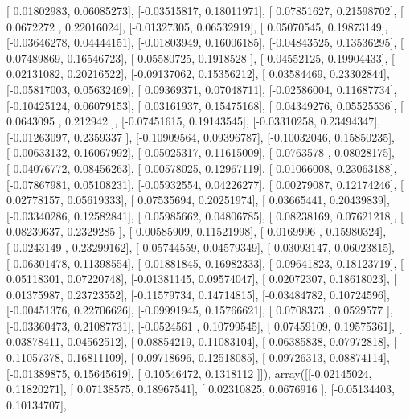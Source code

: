 \documentclass{article}
\begin{document}
       [ 0.01802983,  0.06085273],
       [-0.03515817,  0.18011971],
       [ 0.07851627,  0.21598702],
       [ 0.0672272 ,  0.22016024],
       [-0.01327305,  0.06532919],
       [ 0.05070545,  0.19873149],
       [-0.03646278,  0.04444151],
       [-0.01803949,  0.16006185],
       [-0.04843525,  0.13536295],
       [ 0.07489869,  0.16546723],
       [-0.05580725,  0.1918528 ],
       [-0.04552125,  0.19904433],
       [ 0.02131082,  0.20216522],
       [-0.09137062,  0.15356212],
       [ 0.03584469,  0.23302844],
       [-0.05817003,  0.05632469],
       [ 0.09369371,  0.07048711],
       [-0.02586004,  0.11687734],
       [-0.10425124,  0.06079153],
       [ 0.03161937,  0.15475168],
       [ 0.04349276,  0.05525536],
       [ 0.0643095 ,  0.212942  ],
       [-0.07451615,  0.19143545],
       [-0.03310258,  0.23494347],
       [-0.01263097,  0.2359337 ],
       [-0.10909564,  0.09396787],
       [-0.10032046,  0.15850235],
       [-0.00633132,  0.16067992],
       [-0.05025317,  0.11615009],
       [-0.0763578 ,  0.08028175],
       [-0.04076772,  0.08456263],
       [ 0.00578025,  0.12967119],
       [-0.01066008,  0.23063188],
       [-0.07867981,  0.05108231],
       [-0.05932554,  0.04226277],
       [ 0.00279087,  0.12174246],
       [ 0.02778157,  0.05619333],
       [ 0.07535694,  0.20251974],
       [ 0.03665441,  0.20439839],
       [-0.03340286,  0.12582841],
       [ 0.05985662,  0.04806785],
       [ 0.08238169,  0.07621218],
       [ 0.08239637,  0.2329285 ],
       [ 0.00585909,  0.11521998],
       [ 0.0169996 ,  0.15980324],
       [-0.0243149 ,  0.23299162],
       [ 0.05744559,  0.04579349],
       [-0.03093147,  0.06023815],
       [-0.06301478,  0.11398554],
       [-0.01881845,  0.16982333],
       [-0.09641823,  0.18123719],
       [ 0.05118301,  0.07220748],
       [-0.01381145,  0.09574047],
       [ 0.02072307,  0.18618023],
       [ 0.01375987,  0.23723552],
       [-0.11579734,  0.14714815],
       [-0.03484782,  0.10724596],
       [-0.00451376,  0.22706626],
       [-0.09991945,  0.15766621],
       [ 0.0708373 ,  0.0529577 ],
       [-0.03360473,  0.21087731],
       [-0.0524561 ,  0.10799545],
       [ 0.07459109,  0.19575361],
       [ 0.03878411,  0.04562512],
       [ 0.08854219,  0.11083104],
       [ 0.06385838,  0.07972818],
       [ 0.11057378,  0.16811109],
       [-0.09718696,  0.12518085],
       [ 0.09726313,  0.08874114],
       [-0.01389875,  0.15645619],
       [ 0.10546472,  0.1318112 ]]), array([[-0.02145024,  0.11820271],
       [ 0.07138575,  0.18967541],
       [ 0.02310825,  0.0676916 ],
       [-0.05134403,  0.10134707],
\end{document}
